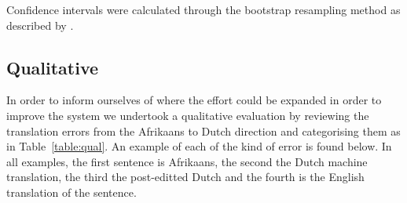 \documentclass[11pt]{article}
\begin{document}
%     
%     
%     
%
%
%     
%     
%     
%     




Confidence intervals were calculated through the bootstrap 
resampling method as described by .


\subsection{Qualitative}

In order to inform ourselves of where the effort could be expanded in order to improve the 
system we undertook a qualitative evaluation by reviewing the translation errors from the Afrikaans
to Dutch direction and categorising them as in Table~\ref{table:qual}. An example of each 
of the kind of error is found below. In all examples, the first sentence is Afrikaans, the second
the Dutch machine translation, the third the post-editted Dutch and the fourth is the English
translation of the sentence.
\end{document}
